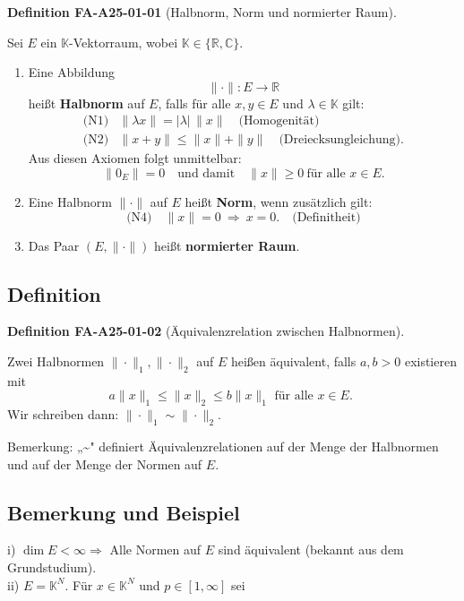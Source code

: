 \documentclass[10pt, letterpaper]{article}
\newcommand{\CustomHeading}[3]{%
  \par\medskip\noindent%
  \textbf{#1 #2} \textnormal{(#3)}.\enskip%
}
\newenvironment{DEF}[2]{\begin{unitbox}\CustomHeading{Definition}{#1}{#2}}{\end{unitbox}}
\begin{document}
\begin{DEF}{FA-A25-01-01}{Halbnorm, Norm und normierter Raum}
Sei $E$ ein $\mathbb{K}$-Vektorraum, wobei $\mathbb{K}\in\{\mathbb{R},\mathbb{C}\}$.

\begin{enumerate}
\item[(i)] Eine Abbildung 
\[
\|\cdot\|:E\longrightarrow\mathbb{R}
\]
heißt \textbf{Halbnorm} auf $E$, falls für alle $x,y\in E$ und $\lambda\in\mathbb{K}$ gilt:
\[
\begin{array}{ll}
\text{(N1)} & \|\lambda x\|=|\lambda|\,\|x\| \quad\text{(Homogenität)}\\[0.4em]
\text{(N2)} & \|x+y\|\le\|x\|+\|y\| \quad\text{(Dreiecksungleichung)}.
\end{array}
\]
Aus diesen Axiomen folgt unmittelbar:
\[
\|0_E\|=0
\quad\text{und damit}\quad
\|x\|\ge0\ \text{für alle }x\in E.
\tag{N3}
\]

\item[(ii)] Eine Halbnorm $\|\cdot\|$ auf $E$ heißt \textbf{Norm}, wenn zusätzlich gilt:
\[
\text{(N4)} \quad
\|x\|=0\ \Longrightarrow\ x=0.
\quad\text{(Definitheit)}
\]
\item[(iii)] Das Paar $(E,\|\cdot\|)$ heißt \textbf{normierter Raum}.
\end{enumerate}
\end{DEF}




\subsection*{Definition}


\begin{DEF}{FA-A25-01-02}{Äquivalenzrelation zwischen Halbnormen}
Zwei Halbnormen $\|\cdot\|_{1},\|\cdot\|_{2}$ auf $E$ heißen äquivalent, falls $a, b>0$ existieren mit
$$
a\|x\|_{1} \leq\|x\|_{2} \leq b\|x\|_{1} \text { für alle } x \in E \text {. }
$$
Wir schreiben dann: $\|\cdot\|_{1} \sim\|\cdot\|_{2}$.

Bemerkung: „\~{}" definiert Äquivalenzrelationen auf der Menge der Halbnormen und auf der Menge der Normen auf $E$.
\end{DEF}


\subsection*{Bemerkung und Beispiel}


i) $\operatorname{dim} E<\infty \Rightarrow$ Alle Normen auf $E$ sind äquivalent (bekannt aus dem Grundstudium).\\
ii) $E=\mathbb{K}^{N}$. Für $x \in \mathbb{K}^{N}$ und $p \in[1, \infty]$ sei
\end{document}
